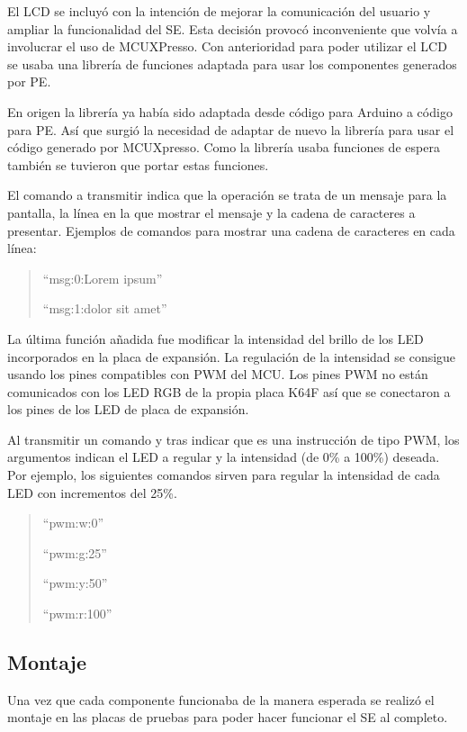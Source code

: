 El LCD se incluyó con la intención de mejorar la comunicación del usuario y
ampliar la funcionalidad del SE. Esta decisión provocó inconveniente que volvía
a involucrar el uso de MCUXPresso. Con anterioridad para poder utilizar el LCD
se usaba una librería de funciones adaptada para usar los componentes generados
por PE. 

En origen la librería ya había sido adaptada desde código para Arduino a
código para PE. Así que surgió la necesidad de adaptar de nuevo la librería para
usar el código generado por MCUXpresso. Como la librería usaba funciones de
espera también se tuvieron que portar estas funciones.

El comando a transmitir indica que la operación se trata de un mensaje para la
pantalla, la línea en la que mostrar el mensaje y la cadena de caracteres a
presentar.
Ejemplos de comandos para mostrar una cadena de caracteres en cada línea:
\begin{quotation}
  ``msg:0:Lorem ipsum''

  ``msg:1:dolor sit amet''
\end{quotation}

La última función añadida fue modificar la intensidad del brillo de los LED
incorporados en la placa de expansión. La regulación de la intensidad se
consigue usando los pines compatibles con PWM del MCU. Los pines PWM no
están comunicados con los LED RGB de la propia placa K64F así que se conectaron
a los pines de los LED de placa de expansión.

Al transmitir un comando y tras indicar que es una instrucción de tipo PWM,
los argumentos indican el LED a regular y la intensidad (de 0\% a 100\%)
deseada. Por ejemplo, los siguientes comandos sirven para regular la intensidad
de cada LED con incrementos del 25\%.
\begin{quotation}
  ``pwm:w:0''

  ``pwm:g:25''

  ``pwm:y:50''

  ``pwm:r:100''
\end{quotation}

\subsection{Montaje }{\label{sec:desarrollo-montaje}}
Una vez que cada componente funcionaba de la manera esperada se realizó
el montaje en las placas de pruebas para poder hacer funcionar el SE al
completo. 

